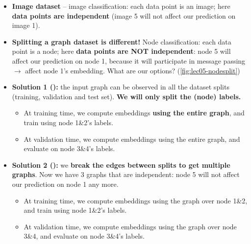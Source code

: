\begin{itemize}
  \item \textbf{Image dataset} -- image classification: each data point is an
    image; here \textbf{data points are independent} (image 5 will not affect
    our prediction on image 1).
  \item \textbf{Splitting a graph dataset is different!} Node classification:
    each data point is a node; here \textbf{data points are NOT independent}:
    node 5 will affect our prediction on node 1, because it will participate in
    message passing $\to$ affect node 1's embedding. What are our options?
    (\cref{fig:lec05-nodesplit})
  \item \textbf{Solution 1 ():} the input graph can
    be observed in all the dataset splits (training, validation and test set).
    \textbf{We will only split the (node) labels.}
    \begin{itemize}
      \item At training time, we compute embeddings \textbf{using the entire
        graph}, and train using node 1\&2's labels.
      \item At validation time, we compute embeddings using the entire graph,
        and evaluate on node 3\&4's labels.
    \end{itemize}
  \item \textbf{Solution 2 ():} we \textbf{break the
    edges between splits to get multiple graphs}. Now we have 3 graphs that are
    independent: node 5 will not affect our prediction on node 1 any more.
    \begin{itemize}
      \item At training time, we compute embeddings using the graph over node
        1\&2, and train using node 1\&2's labels.
      \item At validation time, we compute embeddings using the graph over node
        3\&4, and evaluate on node 3\&4's labels.
    \end{itemize}
\end{itemize}

